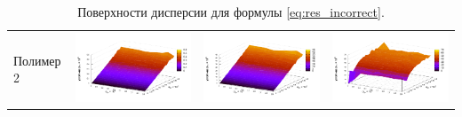 \documentclass[12pt,a4paper]{article}
\begin{document}
\begin{table}[h]
\begin{tabular}{l | c c c}
	\begin{rotate}{90}Полимер 2\end{rotate} &	\includegraphics[scale=0.4]{figs/all/p2.txt_coeff0.dat.pdf} & \includegraphics[scale=0.4]{figs/all/p2.txt_coeff1.dat.pdf} & \includegraphics[scale=0.4]{figs/all/p2.txt_coeff2.dat.pdf}
  \end{tabular}
  \caption{Поверхности дисперсии для формулы \eqref{eq:res_incorrect}.}
  \label{tabl:res_incorrect}
\end{table}
\end{document}
